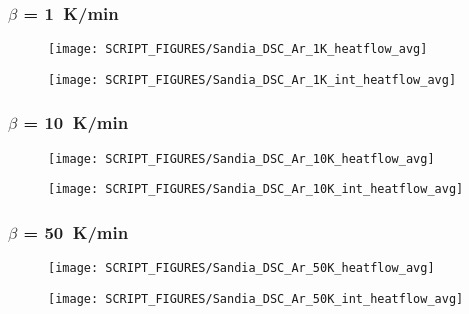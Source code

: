 \begin{landscape}
\subsubsection{$\beta$ = 1~K/min}
\begin{minipage}{0.65\textwidth}
\begin{figure}[H]
{\texttt{[image: SCRIPT\_FIGURES/Sandia\_DSC\_Ar\_1K\_heatflow\_avg]}}\\
\end{figure}
\end{minipage} 
\begin{minipage}{0.35\textwidth}
\begin{figure}[H]
{\texttt{[image: SCRIPT\_FIGURES/Sandia\_DSC\_Ar\_1K\_int\_heatflow\_avg]}}\\
\end{figure}
\end{minipage}
\vfill

\subsubsection{$\beta$ = 10~K/min}
\begin{minipage}{0.65\textwidth}
\begin{figure}[H]
{\texttt{[image: SCRIPT\_FIGURES/Sandia\_DSC\_Ar\_10K\_heatflow\_avg]}}\\
\end{figure}
\end{minipage} 
\begin{minipage}{0.35\textwidth}
\begin{figure}[H]
{\texttt{[image: SCRIPT\_FIGURES/Sandia\_DSC\_Ar\_10K\_int\_heatflow\_avg]}}\\
\end{figure}
\end{minipage}

\newpage
\subsubsection{$\beta$ = 50~K/min}
\begin{minipage}{0.65\textwidth}
\begin{figure}[H]
{\texttt{[image: SCRIPT\_FIGURES/Sandia\_DSC\_Ar\_50K\_heatflow\_avg]}}\\
\end{figure}
\end{minipage} 
\begin{minipage}{0.35\textwidth}
\begin{figure}[H]
{\texttt{[image: SCRIPT\_FIGURES/Sandia\_DSC\_Ar\_50K\_int\_heatflow\_avg]}}\\
\end{figure}
\end{minipage}
\vfill


\end{landscape}
